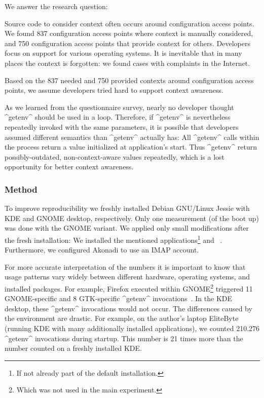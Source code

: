 We answer the research question:
\rqMotivationContextUsage*

\begin{finding}
Source code to consider context often occurs around configuration access points.
We found 837 configuration access points where context is manually considered, and 750 configuration access points that provide context for others.
Developers focus on support for various operating systems.
It is inevitable that in many places the context is forgotten:
we found cases with complaints in the Internet.

\begin{implication}
Based on the 837 needed and 750 provided contexts around configuration access points, we assume developers tried hard to support context awareness.
\end{implication}
\end{finding}









As we learned from the questionnaire survey, nearly no developer thought ^getenv^ should be used in a loop.
Therefore, if ^getenv^ is nevertheless repeatedly invoked with the same parameters, it is possible that developers assumed different semantics than ^getenv^ actually has:
All ^getenv^ calls within the process return a value initialized at application's start.
Thus ^getenv^ return possibly-outdated, non-context-aware values repeatedly, which is a lost opportunity for better context awareness.



\subsubsection{Method}

To improve reproducibility we freshly installed Debian GNU/Linux Jessie with KDE and GNOME desktop, respectively.
Only one measurement (of the boot up) was done with the GNOME variant.
We applied only small modifications after the fresh installation:
We installed the mentioned applications\footnote{If not already part of the default installation.} and \elektra{}~\cite{raab2016unanticipated}.
Furthermore, we configured Akonadi to use an IMAP account.


For more accurate interpretation of the numbers it is important to know that usage patterns vary widely between different hardware, operating systems, and installed packages.
For example, Firefox executed within GNOME\footnote{Which was not used in the main experiment.} triggered 11 GNOME-specific and 8 GTK-specific ^getenv^ invocations~\cite{raab2016unanticipated}.
In the KDE desktop, these ^getenv^ invocations would not occur.
The differences caused by the environment are drastic.
For example, on the author's laptop EliteByte (running KDE with many additionally installed applications), we counted 210.276 ^getenv^ invocations during startup.
This number is 21 times more than the number counted on a freshly installed KDE.


